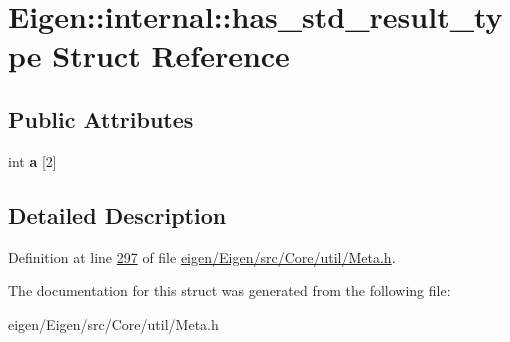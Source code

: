 \hypertarget{struct_eigen_1_1internal_1_1has__std__result__type}{}\section{Eigen\+:\+:internal\+:\+:has\+\_\+std\+\_\+result\+\_\+type Struct Reference}
\label{struct_eigen_1_1internal_1_1has__std__result__type}
\subsection*{Public Attributes}
\begin{DoxyCompactItemize}
\item 
\mbox{\label{struct_eigen_1_1internal_1_1has__std__result__type_a4d5b026b7199c57487ca004b0bba6b11}} 
int {\bfseries a} \mbox{[}2\mbox{]}
\end{DoxyCompactItemize}


\subsection{Detailed Description}


Definition at line \hyperlink{eigen_2_eigen_2src_2_core_2util_2_meta_8h_source_l00297}{297} of file \hyperlink{eigen_2_eigen_2src_2_core_2util_2_meta_8h_source}{eigen/\+Eigen/src/\+Core/util/\+Meta.\+h}.



The documentation for this struct was generated from the following file\+:\begin{DoxyCompactItemize}
\item 
eigen/\+Eigen/src/\+Core/util/\+Meta.\+h\end{DoxyCompactItemize}

